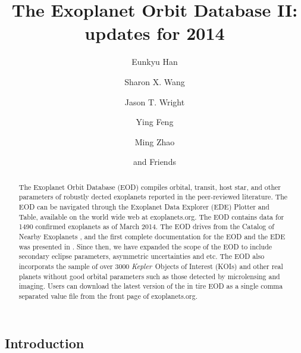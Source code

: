 \documentclass[11pt,preprint]{aastex}
\def\kepler{\textit{Kepler}}
\begin{document}
\begin{CJK*}{UTF8}{gbsn}

\title{The Exoplanet Orbit Database \textsc{II}: updates for 2014}

\author{Eunkyu Han}
\author{Sharon X. Wang}
\author{Jason T. Wright}
\author{Ying Feng}
\author{Ming Zhao}
\author{and Friends}



\begin{abstract}

The Exoplanet Orbit Database (EOD) compiles orbital, transit, host star, and other
parameters of robustly dected exoplanets reported in the peer-reviewed
literature. The EOD can be navigated through the Exoplanet Data
Explorer (EDE) Plotter and Table, available on the world wide web at exoplanets.org. The EOD contains data for 1490 confirmed exoplanets as of March 2014.  
The EOD drives from the Catalog of Nearby Exoplanets \citep{Butler2006}, and the first complete documentation for the EOD and the EDE was presented in 
\cite{Wright2011}. Since then, we have expanded the scope of the
EOD to include secondary eclipse parameters, asymmetric uncertainties and etc. The EOD also incorporats the sample of over 3000 \kepler\ Objects of
Interest (KOIs) and other real planets without good orbital parameters such as those detected by microlensing and imaging. Users can download the latest version of the in tire EOD as a
single comma separated value file from the front page of exoplanets.org. 

\end{abstract}  

\section{Introduction}\label{sec:intro}


\end{CJK*}
\end{document}
